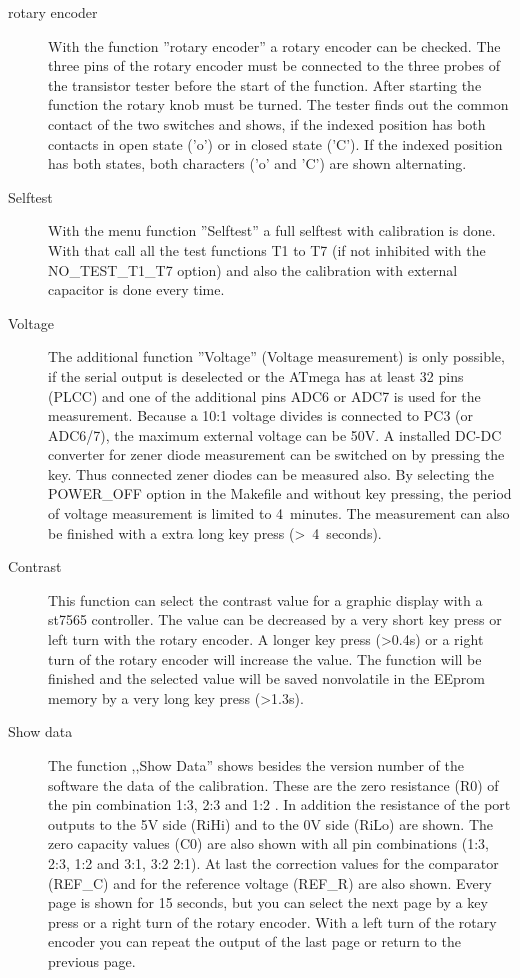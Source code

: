 \begin{description}
\item[rotary encoder]
With the function ''rotary encoder'' a rotary encoder can be checked.
The three pins of the rotary encoder must be connected to the three probes of the transistor tester 
before the start of the function. 
After starting the function the rotary knob must be turned.
The tester finds out the common contact of the two switches and shows, if the indexed position has
both contacts in open state ('o') or in closed state ('C').
If the indexed position has both states, both characters ('o' and 'C') are shown alternating.\\

\item[Selftest]
With the menu function ''Selftest'' a full selftest with calibration is done.
With that call all the test functions T1 to T7 (if not inhibited with the NO\_TEST\_T1\_T7 option) 
and also the calibration with external capacitor is done every time.\\

\item[Voltage]
The additional function ''Voltage'' (Voltage measurement) is only possible, if the serial output is deselected
or the ATmega has at least 32 pins (PLCC) and one of the additional pins ADC6 or ADC7 is used for the measurement.
Because a 10:1 voltage divides is connected to PC3 (or ADC6/7), the maximum external voltage can be 50V.
A installed DC-DC converter for zener diode measurement can be switched on by pressing the key.
Thus connected zener diodes can be measured also.
By selecting the POWER\_OFF option in the Makefile and without key pressing, the period of voltage measurement is limited to 4~minutes.
The measurement can also be finished with a extra long key press (\textgreater~4~seconds).

\item[Contrast] 
This function can select the contrast value for a graphic display with a st7565 controller.
The value can be decreased by a very short key press or left turn with the rotary encoder.
A longer key press (\textgreater 0.4s) or a right turn of the rotary encoder will increase the value.
The function will be finished and the selected value will be saved nonvolatile in the EEprom memory 
by a very long key press (\textgreater 1.3s).

 \item[Show data]
The function ,,Show Data'' shows besides the version number of the software the data of the calibration.
These are the zero resistance (R0) of the pin combination 1:3, 2:3 and 1:2 .
In addition the resistance of the port outputs to the 5V side (RiHi) and
to the 0V side (RiLo) are shown.
The zero capacity values (C0) are also shown with all pin combinations (1:3, 2:3, 1:2 and 3:1, 3:2 2:1).
At last the correction values for the comparator (REF\_C) and for the reference voltage (REF\_R) are also shown.
Every page is shown for 15 seconds, but you can select the next page by a key press or a right turn of the rotary encoder.
With a left turn of the rotary encoder you can repeat the output of the last page or return to the previous page.



\end{description}

